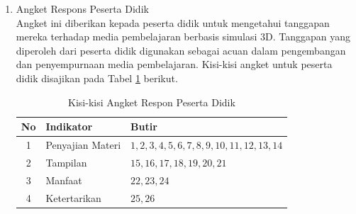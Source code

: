 \begin{enumerate}
\begin{enumerate}
\begin{enumerate}
\begin{table}[H]
\begin{tabular}{|c|p{3.5cm}|p{5.5cm}|p{4.5cm}|}
                \end{tabular}
            \end{table}
            \item Angket Respons Peserta Didik\\
            \hspace*{1cm}Angket ini diberikan kepada peserta didik untuk mengetahui tanggapan mereka terhadap media pembelajaran berbasis simulasi 3D. Tanggapan yang diperoleh dari peserta didik digunakan sebagai acuan dalam pengembangan dan penyempurnaan media pembelajaran. Kisi-kisi angket untuk peserta didik disajikan pada Tabel \ref{kisiresponsiswa} berikut.
            \begin{table}[H]
                \centering
                \caption{Kisi-kisi Angket Respon Peserta Didik}
                \label{kisiresponsiswa}
                \begin{tabular}{|c|p{3cm}|p{6.5cm}|}
                    \hline
                    \textbf{No} & \textbf{Indikator} & \textbf{Butir}\\
                    \hline
                    1 & Penyajian Materi & \(1,2,3,4,5,6,7,8,9,10,11, 12,13,14\)\\
                    2& Tampilan & \(15,16,17,18,19,20,21\)\\
                    3& Manfaat & \(22,23,24\)\\
                    4& Ketertarikan & \(25,26\)\\
                    \hline


\end{tabular}
\end{table}
\end{enumerate}
\end{enumerate}
\end{enumerate}
